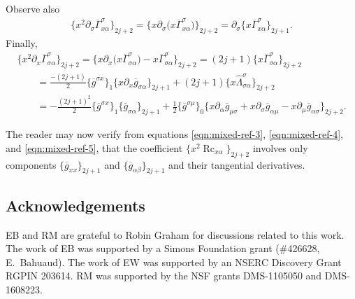 \documentclass[pdftex]{sigma}
\numberwithin{equation}{section}
\newcommand{\olg}{\overline{g}}
\newcommand{\olGamma}{\overline{\Gamma}}
\newcommand{\gbar}{\overline{g}}
\DeclareMathOperator{\Rc}{Rc}
\begin{document}
Observe also
\begin{gather}\label{eqn:mixed-ref-4}
\big\{x^2 \partial_{\sigma} \olGamma_{x \alpha}^{\sigma}\big\}_{2j+2} = \big\{ x \partial_{\sigma} \big( x \olGamma_{x \alpha}^{\sigma} \big) \big\}_{2j+2}= \partial_{\sigma}\big\{ x \olGamma_{x \alpha}^{\sigma} \big\}_{2j+1}.
\end{gather}
Finally,
\begin{gather}
\big\{x^2 \partial_{x} \olGamma_{\sigma \alpha}^{\sigma}\big\}_{2j+2} = \big\{x \partial_{x} \big(x\olGamma_{\sigma \alpha}^{\sigma}\big) - x\olGamma_{\sigma \alpha}^{\sigma} \big\}_{2j+2}
 = (2j+1)\big\{x\olGamma_{\sigma \alpha}^{\sigma} \big\}_{2j+2}\nonumber \\
\qquad{} = \frac{-(2j+1)}{2} \{ \gbar^{\sigma x} \}_1 \{x \partial_x \gbar_{\sigma \alpha} \}_{2j+1} + (2j+1)\big\{ x \hat{\Lambda}_{\sigma \alpha}^{\sigma}\big\}_{2j+2} \nonumber\\
\qquad{} = -\frac{(2j+1)^2}{2} \{ \gbar^{\sigma x} \}_1 \{\gbar_{\sigma \alpha} \}_{2j+1} + \frac{1}{2}
\{\gbar^{\sigma \mu}\}_0 \{ x\partial_{\alpha} \gbar_{\mu \sigma}+ x\partial_{\sigma} \gbar_{\alpha \mu} - x\partial_{\mu} \gbar_{\alpha \sigma}\}_{2j+2}.\label{eqn:mixed-ref-5}
\end{gather}

The reader may now verify from equations \eqref{eqn:mixed-ref-3}, \eqref{eqn:mixed-ref-4}, and \eqref{eqn:mixed-ref-5}, that the coefficient $\big\{ x^2 \Rc_{x\alpha} \big\}_{2j+2}$ involves only components $\{ \olg_{xx} \}_{2j+1}$ and $\{ \olg_{\alpha \beta} \}_{2j+1}$ and their tangential derivatives.

\subsection*{Acknowledgements}
EB and RM are grateful to Robin Graham for discussions related to this work. The work of EB was supported by a Simons Foundation grant (\#426628, E.~Bahuaud). The work of EW was supported by an NSERC Discovery Grant RGPIN 203614. RM was supported by the NSF grants DMS-1105050 and DMS-1608223.
\end{document}
